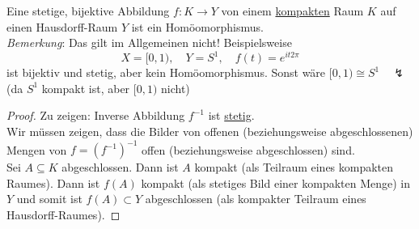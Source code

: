 \begin{theorem}
  Eine stetige, bijektive Abbildung \( f : K \to Y \) von einem \hyperref[def:kompakt]{kompakten} Raum \( K \) auf einen Hausdorff-Raum \( Y \) ist ein Homöomorphismus. \\
  \emph{Bemerkung}: Das gilt im Allgemeinen nicht! Beispielsweise
  \begin{equation*}
    X = [0,1), \quad Y = S^1, \quad f(t) = e^{it2\pi}
  \end{equation*}
  ist bijektiv und stetig, aber kein Homöomorphismus. Sonst wäre \( [0,1) \cong S^1 \quad \lightning \) (da \( S^1 \) kompakt ist, aber \( [0,1) \) nicht)
  \begin{proof}
    Zu zeigen: Inverse Abbildung \( f^{-1} \) ist \hyperref[def:stetig]{stetig}. \\
    Wir müssen zeigen, dass die Bilder von offenen (beziehungsweise abgeschlossenen) Mengen von \( f = {\left( f^{-1} \right)}^{-1} \) offen (beziehungsweise abgeschlossen) sind. \\
    Sei \( A \subseteq K \) abgeschlossen. Dann ist \( A \) kompakt (als Teilraum eines kompakten Raumes). Dann ist \( f(A) \) kompakt (als stetiges Bild einer kompakten Menge) in \( Y \) und somit ist \( f(A) \subset Y \) abgeschlossen (als kompakter Teilraum eines Hausdorff-Raumes).
  \end{proof}
\end{theorem}
